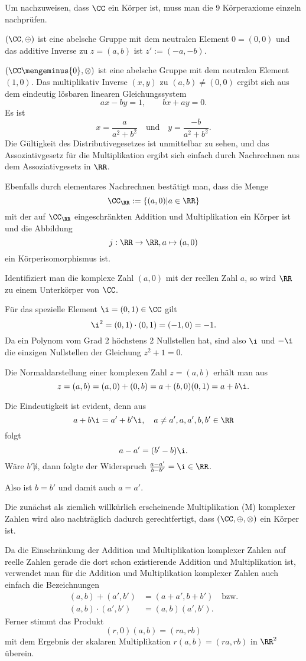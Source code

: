 \begin{antwort}
Um nachzuweisen, dass $\CC$ ein Körper ist, muss man die 9 Körperaxiome einzeln nachprüfen. 

$(\CC,\oplus)$ ist eine abelsche Gruppe mit dem neutralen Element $0=(0,0)$ und das 
additive Inverse zu $z=(a,b)$ ist $z':=(-a,-b)$. 

$(\CC\mengeminus\{0\},\otimes)$ ist eine abelsche Gruppe mit dem neutralen Element $(1,0)$. Das multiplikativ Inverse $(x,y)$ zu $(a,b) \not= (0,0)$ ergibt sich 
aus dem eindeutig lösbaren linearen Gleichungssystem 
\[
ax-by = 1, \qquad bx+ay = 0.
\]
Es ist 
\[
x=\frac{a}{a^2+b^2}\quad\text{und}\quad
y=\frac{-b}{a^2+b^2}.
\]
Die Gültigkeit des Distributivegesetzes ist unmittelbar zu sehen, 
und das Assoziativgesetz für die Multiplikation ergibt sich einfach 
durch Nachrechnen aus dem Assoziativgesetz in $\RR$.

Ebenfalls durch elementares Nachrechnen bestätigt man, dass die Menge 
\[
\CC_{\RR} := \left\{ (a,0) | a\in\RR \right\}
\]
mit der auf $\CC_{\RR}$ eingeschränkten Addition und Multiplikation ein Körper ist 
und die Abbildung 
\[
j: \RR\to\RR, a \mapsto (a,0)
\]
ein Körperisomorphismus ist.

Identifiziert man die komplexe Zahl $(a,0)$ mit der reellen Zahl $a$, 
so wird $\RR$ zu einem Unterkörper von $\CC$.

Für das spezielle Element $\i=(0,1) \in \CC$ gilt 
\[
\i^2 = (0,1) \cdot (0,1) = (-1,0) = -1.
\]
Da ein Polynom vom Grad 2 höchstens 2 Nullstellen hat, sind also $\i$ und 
$-\i$ die einzigen Nullstellen der Gleichung $z^2 +1=0$. 

Die Normaldarstellung einer komplexen Zahl $z=(a,b)$ erhält man aus 
\[
z=(a,b) = (a,0) + (0,b) = a + (b,0) (0,1) = a+b\i.
\]

Die Eindeutigkeit ist evident, denn aus 
\[
a+b\i = a'+b'\i, \quad a\not=a', a,a',b,b' \in\RR
\]
folgt 
\[
a-a' = (b'-b) \i.
\]
Wäre $b'\not b$, dann folgte der Widerspruch $\frac{a-a'}{b-b'} = \i \in\RR$.

Also ist $b=b'$ und damit auch $a=a'$.   
\end{antwort}

\bigskip

Die zunächst als ziemlich willkürlich erscheinende Multiplikation 
(M) komplexer Zahlen wird also nachträglich dadurch gerechtfertigt, dass 
$(\CC, \oplus, \otimes)$ ein Körper ist. 

Da die Einschränkung der Addition und Multiplikation komplexer Zahlen 
auf reelle Zahlen gerade die dort schon existierende Addition und Multiplikation 
ist, verwendet man für die Addition und Multiplikation komplexer Zahlen 
auch einfach die Bezeichnungen
\begin{align*}
(a,b) + (a',b') &= (a+a', b+b')\quad \text{bzw.}\\
(a,b) \cdot (a',b') &= (a,b) (a',b').
\end{align*}
Ferner stimmt das Produkt 
\[
(r,0) (a,b) = (ra,rb)
\]
mit dem Ergebnis der skalaren Multiplikation $r(a,b) = (ra,rb)$ in $\RR^2$ überein.



